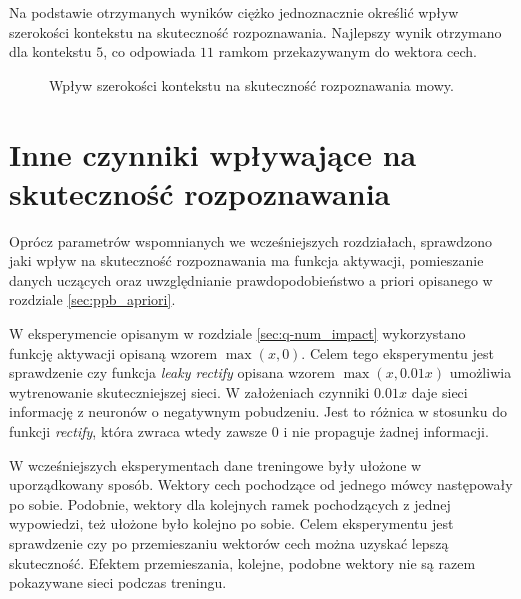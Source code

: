 \documentclass[shortabstract, mgr]{iithesis}
\begin{document}
		Na podstawie otrzymanych wyników ciężko jednoznacznie określić wpływ szerokości kontekstu na skuteczność rozpoznawania. Najlepszy wynik otrzymano dla kontekstu $5$, co odpowiada $11$ ramkom przekazywanym do wektora cech.
		
		\begin{figure}[H]
			\centering
			\label{fig:fig_ctx_impact}
			\caption{Wpływ szerokości kontekstu na skuteczność rozpoznawania mowy.}
		\end{figure}

	\section{ Inne czynniki wpływające na skuteczność rozpoznawania }
		\label{sec:impact_other}
		Oprócz parametrów wspomnianych we wcześniejszych rozdziałach, sprawdzono jaki wpływ na skuteczność rozpoznawania ma funkcja aktywacji, pomieszanie danych uczących oraz uwzględnianie prawdopodobieństwo a priori opisanego w rozdziale \ref{sec:ppb_apriori}.
		
		W eksperymencie opisanym w rozdziale \ref{sec:q-num_impact} wykorzystano funkcję aktywacji opisaną wzorem $\max(x,0)$. Celem tego eksperymentu jest sprawdzenie czy funkcja \textit{leaky rectify} opisana wzorem $\max(x, 0.01x)$ umożliwia wytrenowanie skuteczniejszej sieci. W założeniach czynniki $0.01x$ daje sieci informację z neuronów o negatywnym pobudzeniu. Jest to różnica w stosunku do funkcji \textit{rectify}, która zwraca wtedy zawsze $0$ i nie propaguje żadnej informacji. 
		
		W wcześniejszych eksperymentach dane treningowe były ułożone w uporządkowany sposób. Wektory cech pochodzące od jednego mówcy następowały po sobie. Podobnie, wektory dla kolejnych ramek pochodzących z jednej wypowiedzi, też  ułożone było kolejno po sobie. Celem eksperymentu jest sprawdzenie czy po przemieszaniu wektorów cech można uzyskać lepszą skuteczność. Efektem przemieszania, kolejne, podobne wektory nie są razem pokazywane sieci podczas treningu.
		
\end{document}
